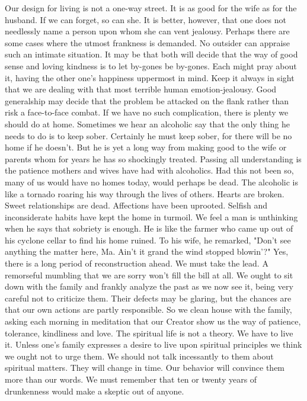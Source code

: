 \begin{biblechapter}
Our design for living is not a one-way street.  It is as good for the wife as for the husband.  If we can forget, so can she.  It is better, however, that one does not needlessly name a person upon whom she can vent jealousy.
Perhaps there are some cases where the utmost frankness is demanded.  No outsider can appraise such an intimate situation.  It may be that both will decide that the way of good sense and loving kindness is to let by-gones be by-gones.  Each might pray about it, having the other one's happiness uppermost in mind.  Keep it always in sight that we are dealing with that most terrible human emotion-jealousy.  Good generalship may decide that the problem be attacked on the flank rather than risk a face-to-face combat.
If we have no such complication, there is plenty we should do at home.  Sometimes we hear an alcoholic say that the only thing he needs to do is to keep sober.  Certainly he must keep sober, for there will be no home if he doesn't.  But he is yet a long way from making good to the wife or parents whom for years he has so shockingly treated.  Passing all understanding is the patience mothers and wives have had with alcoholics.  Had this not been so, many of us would have no homes today, would perhaps be dead.
The alcoholic is like a tornado roaring his way through the lives of others.  Hearts are broken.  Sweet relationships are dead.  Affections have been uprooted.  Selfish and inconsiderate habits have kept the home in turmoil.  We feel a man is unthinking when he says that sobriety is enough.  He is like the farmer who came up out of his cyclone cellar to find his home ruined.  To his wife, he remarked, "Don't see anything the matter here, Ma.  Ain't it grand the wind stopped blowin'?"
Yes, there is a long period of reconstruction ahead.  We must take the lead.  A remorseful mumbling that we are sorry won't fill the bill at all.  We ought to sit down with the family and frankly analyze the past as we now see it, being very careful not to criticize them.  Their defects may be glaring, but the chances are that our own actions are partly responsible.  So we clean house with the family, asking each morning in meditation that our Creator show us the way of patience, tolerance, kindliness and love.
The spiritual life is not a theory.  We have to live it.  Unless one's family expresses a desire to live upon spiritual principles we think we ought not to urge them.  We should not talk incessantly to them about spiritual matters.  They will change in time.  Our behavior will convince them more than our words.  We must remember that ten or twenty years of drunkenness would make a skeptic out of anyone.

\end{biblechapter}
